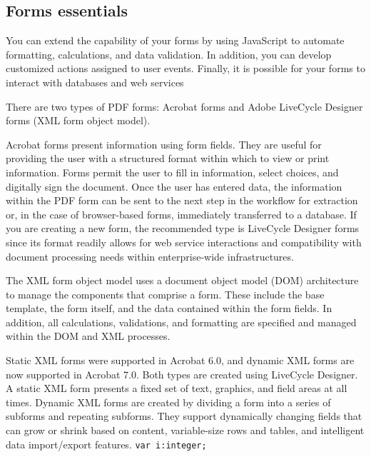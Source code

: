 \begin{multicols}{2}
\section{Forms essentials}

You can extend the capability of your forms by using JavaScript to automate formatting, calculations, and data validation. In addition, you can develop customized actions assigned to user events. Finally, it is possible for your forms to interact with databases and web services

There are two types of PDF forms: Acrobat forms and Adobe LiveCycle Designer forms (XML form object model).

Acrobat forms present information using form fields. They are useful for providing the user with a structured format within which to view or print information. Forms permit the user to fill in information, select choices, and digitally sign the document. Once the user has entered data, the information within the PDF form can be sent to the next step in the workflow for extraction or, in the case of browser-based forms, immediately transferred to a database. If you are creating a new form, the recommended type is LiveCycle Designer forms since its format readily allows for web service interactions and compatibility with document processing needs within enterprise-wide infrastructures.

The XML form object model uses a document object model (DOM) architecture to manage the components that comprise a form. These include the base template, the form itself, and the data contained within the form fields. In addition, all calculations, validations, and formatting are specified and managed within the DOM and XML processes.

Static XML forms were supported in Acrobat 6.0, and dynamic XML forms are now supported in Acrobat 7.0. Both types are created using LiveCycle Designer. A static XML form presents a fixed set of text, graphics, and field areas at all times. Dynamic XML forms are created by dividing a form into a series of subforms and repeating subforms. They support dynamically changing fields that can grow or shrink based on content, variable-size rows and tables, and intelligent data import/export features. \lstinline!var i:integer;!
\end{multicols}

